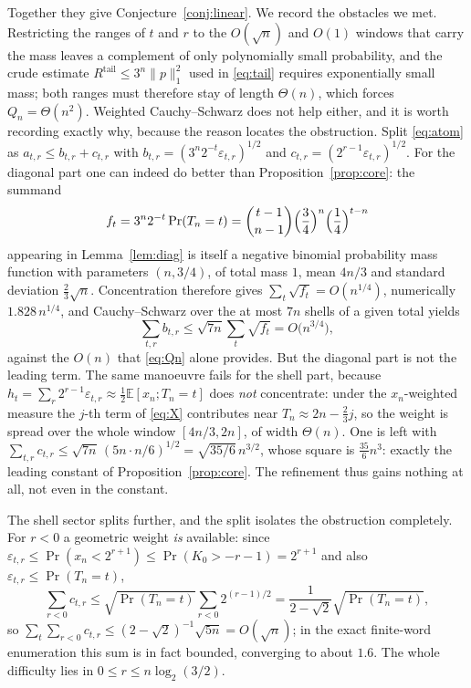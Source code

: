 \documentclass[11pt,reqno]{amsart}
\theoremstyle{plain}
\theoremstyle{definition}
\theoremstyle{remark}
\newcommand{\E}{\mathbb{E}}
\newcommand{\Prob}{\operatorname{Pr}}
\begin{document}
Together they give Conjecture~\ref{conj:linear}. We record the obstacles we
met. Restricting the ranges of $t$ and $r$ to the $O(\sqrt n)$ and $O(1)$
windows that carry the mass leaves a complement of only polynomially small
probability, and the crude estimate $R^{\mathrm{tail}}\le3^n\|p\|_1^2$ used
in \eqref{eq:tail} requires exponentially small mass; both ranges must
therefore stay of length $\Theta(n)$, which forces $Q_n=\Theta(n^2)$.
Weighted Cauchy--Schwarz does not help either, and it is worth recording
exactly why, because the reason locates the obstruction. Split
\eqref{eq:atom} as $a_{t,r}\le b_{t,r}+c_{t,r}$ with
$b_{t,r}=(3^n2^{-t}\varepsilon_{t,r})^{1/2}$ and
$c_{t,r}=(2^{r-1}\varepsilon_{t,r})^{1/2}$. For the diagonal part one can
indeed do better than Proposition~\ref{prop:core}: the summand
\[
f_t=3^n2^{-t}\Prob(T_n=t)=\binom{t-1}{n-1}\Bigl(\frac34\Bigr)^n
\Bigl(\frac14\Bigr)^{t-n}
\]
appearing in Lemma~\ref{lem:diag} is itself a negative binomial probability
mass function with parameters $(n,3/4)$, of total mass $1$, mean $4n/3$ and
standard deviation $\tfrac23\sqrt n$. Concentration therefore gives
$\sum_t\sqrt{f_t}=O(n^{1/4})$, numerically $1.828\,n^{1/4}$, and
Cauchy--Schwarz over the at most $7n$ shells of a given total yields
\begin{equation}
\sum_{t,r}b_{t,r}\le\sqrt{7n}\sum_t\sqrt{f_t}=O\bigl(n^{3/4}\bigr),
\label{eq:diagsector}
\end{equation}
against the $O(n)$ that \eqref{eq:Qn} alone provides. But the diagonal part
is not the leading term. The same manoeuvre fails for the shell part,
because $h_t=\sum_r2^{r-1}\varepsilon_{t,r}\approx\tfrac12\E[x_n;T_n=t]$
does \emph{not} concentrate: under the $x_n$-weighted measure the $j$-th
term of \eqref{eq:X} contributes near $T_n\approx2n-\tfrac23j$, so the
weight is spread over the whole window $[4n/3,2n]$, of width $\Theta(n)$.
One is left with
$\sum_{t,r}c_{t,r}\le\sqrt{7n}\,(5n\cdot n/6)^{1/2}=\sqrt{35/6}\,n^{3/2}$,
whose square is $\tfrac{35}6n^3$: exactly the leading constant of
Proposition~\ref{prop:core}. The refinement thus gains nothing at all, not
even in the constant.

The shell sector splits further, and the split isolates the obstruction
completely. For $r<0$ a geometric weight \emph{is} available: since
$\varepsilon_{t,r}\le\Prob(x_n<2^{r+1})\le\Prob(K_0>-r-1)=2^{r+1}$ and also
$\varepsilon_{t,r}\le\Prob(T_n=t)$,
\begin{equation}
\sum_{r<0}c_{t,r}
\le\sqrt{\Prob(T_n=t)}\sum_{r<0}2^{(r-1)/2}
=\frac{1}{2-\sqrt2}\sqrt{\Prob(T_n=t)},
\label{eq:negshell}
\end{equation}
so $\sum_{t}\sum_{r<0}c_{t,r}\le(2-\sqrt2)^{-1}\sqrt{5n}=O(\sqrt n)$; in
the exact finite-word enumeration this sum is in fact bounded, converging
to about
$1.6$. The whole difficulty lies in $0\le r\le n\log_2(3/2)$.
\end{document}
